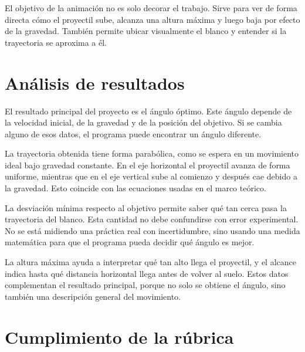 \documentclass[12pt,letterpaper]{article}
\begin{document}
El objetivo de la animaci\'{o}n no es solo decorar el trabajo. Sirve para ver de forma directa c\'{o}mo el proyectil sube, alcanza una altura m\'{a}xima y luego baja por efecto de la gravedad. Tambi\'{e}n permite ubicar visualmente el blanco y entender si la trayectoria se aproxima a \'{e}l.

\section{An\'{a}lisis de resultados}

El resultado principal del proyecto es el \'{a}ngulo \'{o}ptimo. Este \'{a}ngulo depende de la velocidad inicial, de la gravedad y de la posici\'{o}n del objetivo. Si se cambia alguno de esos datos, el programa puede encontrar un \'{a}ngulo diferente.

La trayectoria obtenida tiene forma parab\'{o}lica, como se espera en un movimiento ideal bajo gravedad constante. En el eje horizontal el proyectil avanza de forma uniforme, mientras que en el eje vertical sube al comienzo y despu\'{e}s cae debido a la gravedad. Esto coincide con las ecuaciones usadas en el marco te\'{o}rico.

La desviaci\'{o}n m\'{i}nima respecto al objetivo permite saber qu\'{e} tan cerca pasa la trayectoria del blanco. Esta cantidad no debe confundirse con error experimental. No se est\'{a} midiendo una pr\'{a}ctica real con incertidumbre, sino usando una medida matem\'{a}tica para que el programa pueda decidir qu\'{e} \'{a}ngulo es mejor.

La altura m\'{a}xima ayuda a interpretar qu\'{e} tan alto llega el proyectil, y el alcance indica hasta qu\'{e} distancia horizontal llega antes de volver al suelo. Estos datos complementan el resultado principal, porque no solo se obtiene el \'{a}ngulo, sino tambi\'{e}n una descripci\'{o}n general del movimiento.

\section{Cumplimiento de la r\'{u}brica}
\end{document}

